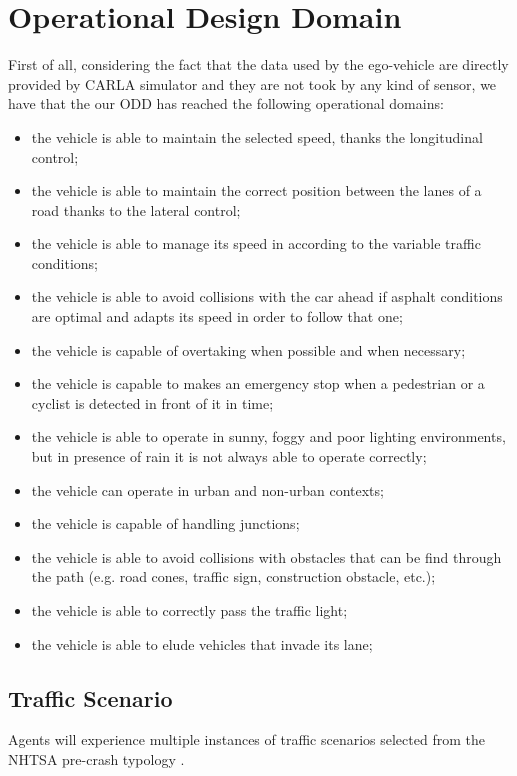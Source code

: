 \documentclass{article}
\begin{document}
\section{Operational Design Domain}
First of all, considering the fact that the data used by the ego-vehicle are directly provided by CARLA simulator and they are not took by any kind of sensor, we have 
that the our ODD has reached the following operational domains:
\begin{itemize}
    \item the vehicle is able to maintain the selected speed, thanks the longitudinal control;
    \item the vehicle is able to maintain the correct position between the lanes of a road thanks to the lateral control;
    \item the vehicle is able to manage its speed in according to the variable traffic conditions;
    \item the vehicle is able to avoid collisions with the car ahead if asphalt conditions are optimal and adapts its speed in order to follow that one;
    \item the vehicle is capable of overtaking when possible and when necessary;
    \item the vehicle is capable to makes an emergency stop when a pedestrian or a cyclist is detected in front of it in time;
    \item the vehicle is able to operate in sunny, foggy and poor lighting environments, but in presence of rain it is not always able to operate correctly;
    \item the vehicle can operate in urban and non-urban contexts;
    \item the vehicle is capable of handling junctions;
    \item the vehicle is able to avoid collisions with obstacles that can be find through the path (e.g. road cones, traffic sign, construction obstacle, etc.);
    \item the vehicle is able to correctly pass the traffic light;
    \item the vehicle is able to elude vehicles that invade its lane;
\end{itemize}

\subsection{Traffic Scenario}
Agents will experience multiple instances of traffic scenarios selected from the NHTSA pre-crash typology \cite{NHTSA}. 
\newpage
\end{document}
